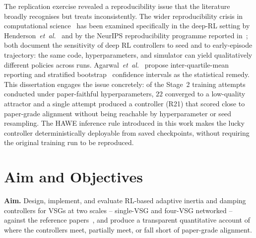 \documentclass{unnc-fyp}
\begin{document}
The replication exercise revealed a reproducibility issue that
the literature broadly recognises but treats inconsistently.
The wider reproducibility crisis in computational
science~\cite{baker2016reproducibility} has been examined
specifically in the deep-RL setting by
Henderson~\emph{et~al.}~\cite{henderson2018deepreinforcement} and
by the NeurIPS reproducibility programme reported
in~\cite{pineau2021reproducibility}; both document the sensitivity
of deep RL controllers to seed and to early-episode trajectory:
the same code, hyperparameters, and simulator can yield
qualitatively different policies across runs.
Agarwal~\emph{et~al.}~\cite{agarwal2021precipice} propose
inter-quartile-mean reporting and stratified
bootstrap~\cite{efron1979bootstrap} confidence intervals as the
statistical remedy.
This dissertation engages the issue concretely: of the Stage~2
training attempts conducted under paper-faithful hyperparameters,
$22$ converged to a low-quality attractor and a single
attempt produced a controller (R21) that scored close to
paper-grade alignment without being reachable by hyperparameter
or seed resampling.
The HAWE inference rule introduced in this work makes the lucky
controller deterministically deployable from saved checkpoints,
without requiring the original training run to be reproduced.

\section{Aim and Objectives}
\label{sec:aim-objectives}

\textbf{Aim.}
Design, implement, and evaluate RL-based adaptive inertia and
damping controllers for VSGs at two scales -- single-VSG and
four-VSG networked -- against the reference
papers~\cite{benhmidouch2024td3,yang2023ddic}, and produce a
transparent quantitative account of where the controllers meet,
partially meet, or fall short of paper-grade alignment.
\end{document}
